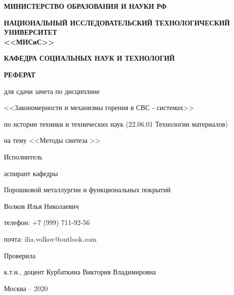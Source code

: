 
\thispagestyle{empty}	

	\begin{center}
		\textbf{МИНИСТЕРСТВО ОБРАЗОВАНИЯ И НАУКИ РФ}
		\vspace{1ex}
		
		\textbf{НАЦИОНАЛЬНЫЙ ИССЛЕДОВАТЕЛЬСКИЙ ТЕХНОЛОГИЧЕСКИЙ УНИВЕРСИТЕТ \\ <<МИСиС>>}
		
		\vspace{1ex}
		
		\textbf{КАФЕДРА СОЦИАЛЬНЫХ НАУК И ТЕХНОЛОГИЙ}
	\end{center}
	
	\begin{center}
		\vspace{8ex}
		\textbf{РЕФЕРАТ}
		\vspace{1ex}
		
		для сдачи зачета по дисциплине
		
		<<Закономерности и механизмы горения в СВС - системах>>
		
	
		по истории техники и технических наук (22.06.01 Технологии материалов)
		
        на тему <<Методы синтеза >>
		
		\vspace{2ex}
		
		\begin{flushright}
	
			Исполнитель
			
			аспирант кафедры 
			
			Порошковой металлургии и функциональных покрытий
						
			Волков Илья Николаевич
			
			телефон: +7 (999) 711-92-56
			
			почта: ilia.volkov@outlook.com
			
			\vspace{2ex}
			Проверила
			
			\underline{\hspace{9cm}}
			
			к.т.н., доцент Курбаткина Виктория Владимировна
			 
		\end{flushright}
		
		\vfill
		Москва -- 2020
	\end{center}


